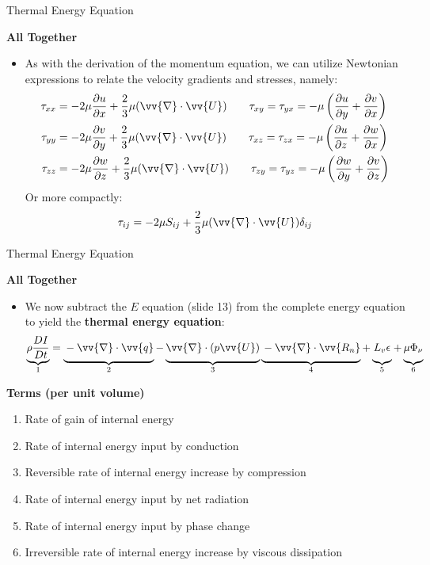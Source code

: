 \begin{frame}{Thermal Energy Equation}

\textbf{All Together}
\begin{itemize}
	\item As with the derivation of the momentum equation, we can utilize Newtonian expressions to relate the velocity gradients and stresses, namely:
	\begin{align*}
	\tau_{xx} &= -2\mu\frac{\partial u}{\partial x} + \frac{2}{3}\mu(\vv{\nabla}\cdot\vv{U}) \qquad \tau_{xy} = \tau_{yx} = -\mu\left(\frac{\partial u}{\partial y} + \frac{\partial v}{\partial x}\right)\\
	\tau_{yy} &= -2\mu\frac{\partial v}{\partial y} + \frac{2}{3}\mu(\vv{\nabla}\cdot\vv{U}) \qquad \tau_{xz} = \tau_{zx} = -\mu\left(\frac{\partial u}{\partial z} + \frac{\partial w}{\partial x}\right)\\
	\tau_{zz} &= -2\mu\frac{\partial w}{\partial z} + \frac{2}{3}\mu(\vv{\nabla}\cdot\vv{U}) \qquad \tau_{zy} = \tau_{yz} = -\mu\left(\frac{\partial w}{\partial y} + \frac{\partial v}{\partial z}\right)\\
	\end{align*}
	Or more compactly:
	$$\tau_{ij} = -2\mu S_{ij} + \frac{2}{3}\mu(\vv{\nabla} \cdot \vv{U}) \delta_{ij}$$
\end{itemize}
\end{frame}
\begin{frame}{Thermal Energy Equation}

\textbf{All Together}
\begin{itemize}
	\item We now subtract the $E$ equation (slide 13) from the complete energy equation to yield the \textbf{thermal energy equation}:
	$$\underbrace{\rho \frac{DI}{Dt}}_{1} = \underbrace{\vphantom{\frac{DI}{Dt}}-\vv{\nabla}\cdot \vv{q}}_{2} -\underbrace{\vphantom{\frac{DI}{Dt}}\vv{\nabla}\cdot (p\vv{U})}_{3} \underbrace{\vphantom{\frac{DI}{Dt}}-\vv{\nabla}\cdot \vv{R_n}}_{4} + \underbrace{\vphantom{\frac{DI}{Dt}}L_v\epsilon}_{5} + \underbrace{\vphantom{\frac{DI}{Dt}}\mu \Phi_\nu}_{6}$$
\end{itemize}
\textbf{Terms (per unit volume)}
\begin{enumerate}
	\item Rate of gain of internal energy
	\item Rate of internal energy input by conduction
	\item Reversible rate of internal energy increase by compression
	\item Rate of internal energy input by net radiation
	\item Rate of internal energy input by phase change
	\item Irreversible rate of internal energy increase by viscous dissipation 
\end{enumerate}
\end{frame}
